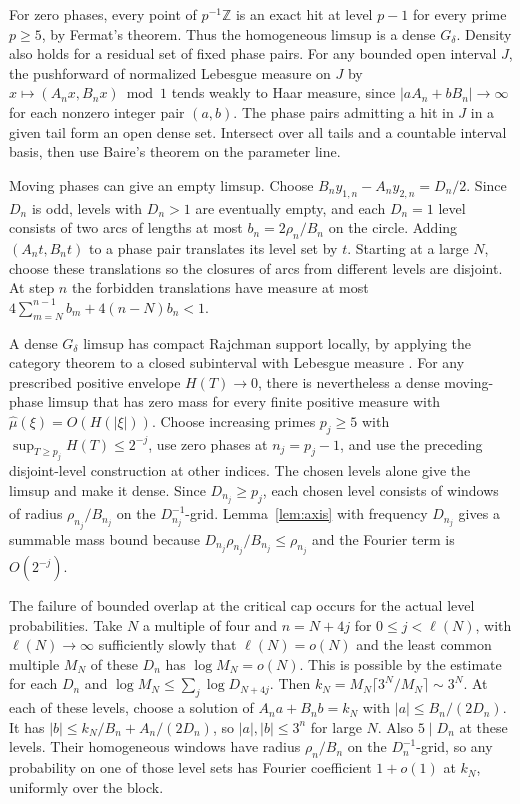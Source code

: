 \documentclass[11pt,a4paper,reqno]{amsart}
\theoremstyle{definition}
\theoremstyle{remark}
\numberwithin{equation}{section}
\begin{document}
For zero phases, every point of $p^{-1}\mathbb Z$ is an exact hit
at level $p-1$ for every prime $p\ge5$, by Fermat's theorem. Thus the homogeneous limsup
is a dense $G_\delta$. Density also holds for a residual set of fixed
phase pairs. For any bounded open interval $J$, the pushforward of
normalized Lebesgue measure on $J$ by $x\mapsto (A_nx,B_nx)\bmod 1$
tends weakly to Haar measure, since $|aA_n+bB_n|\to\infty$ for each
nonzero integer pair $(a,b)$. The phase pairs admitting a hit in $J$
in a given tail form an open dense set. Intersect over all tails and
a countable interval basis, then use Baire's theorem on the parameter
line.

Moving phases can give an empty limsup. Choose
$B_ny_{1,n}-A_ny_{2,n}=D_n/2$. Since $D_n$ is odd, levels with
$D_n>1$ are eventually empty, and each $D_n=1$ level consists of two
arcs of lengths at most $b_n=2\rho_n/B_n$ on the circle. Adding
$(A_nt,B_nt)$ to a phase pair translates its level set by $t$.
Starting at a large $N$, choose these translations so the closures
of arcs from different levels are disjoint. At step $n$ the
forbidden translations have measure at most
$4\sum_{m=N}^{n-1}b_m+4(n-N)b_n<1$.

A dense $G_\delta$ limsup has compact Rajchman support locally, by
applying the category theorem to a closed subinterval with Lebesgue measure
\cite[Corollaries~4.4--4.5]{MZ}. For any prescribed positive envelope
$H(T)\to0$, there is nevertheless a dense moving-phase limsup that
has zero mass for every finite positive measure with
$\widehat\mu(\xi)=O(H(|\xi|))$. Choose increasing primes $p_j\ge5$
with $\sup_{T\ge p_j}H(T)\le2^{-j}$, use zero phases at $n_j=p_j-1$,
and use the preceding disjoint-level construction at other indices.
The chosen levels alone give the limsup and make it dense. Since
$D_{n_j}\ge p_j$, each chosen level consists of windows of radius
$\rho_{n_j}/B_{n_j}$ on the $D_{n_j}^{-1}$-grid.
Lemma~\ref{lem:axis} with frequency $D_{n_j}$ gives a summable mass
bound because $D_{n_j}\rho_{n_j}/B_{n_j}\le\rho_{n_j}$ and the
Fourier term is $O(2^{-j})$.

The failure of bounded overlap at the critical cap occurs for the
actual level probabilities. Take $N$ a multiple of four and
$n=N+4j$ for $0\le j<\ell(N)$, with $\ell(N)\to\infty$ sufficiently
slowly that $\ell(N)=o(N)$ and the least common multiple $M_N$ of
these $D_n$ has $\log M_N=o(N)$. This is possible by the estimate
for each $D_n$ and $\log M_N\le\sum_j\log D_{N+4j}$.
Then $k_N=M_N\lceil3^N/M_N\rceil\sim3^N$. At each of these levels,
choose a solution of $A_na+B_nb=k_N$ with $|a|\le B_n/(2D_n)$.
It has $|b|\le k_N/B_n+A_n/(2D_n)$, so $|a|,|b|\le 3^n$ for
large $N$. Also $5\mid D_n$ at these levels. Their homogeneous
windows have radius $\rho_n/B_n$ on the $D_n^{-1}$-grid, so any
probability on one of those level sets has Fourier coefficient
$1+o(1)$ at $k_N$, uniformly over the block.
\end{document}
